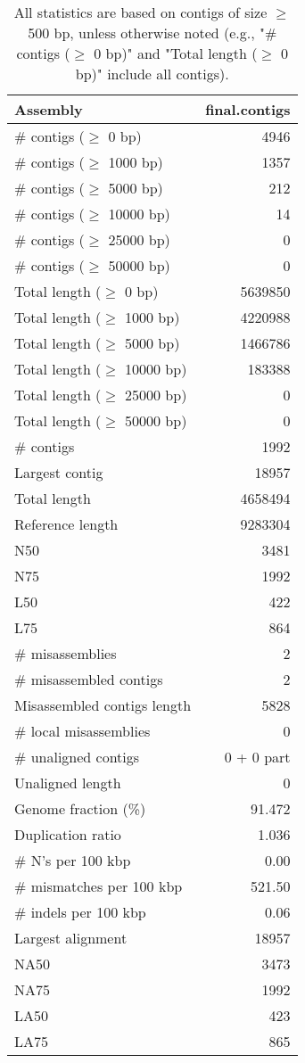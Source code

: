 \documentclass[12pt,a4paper]{article}
\begin{document}
\begin{table}[ht]
\begin{center}
\caption{All statistics are based on contigs of size $\geq$ 500 bp, unless otherwise noted (e.g., "\# contigs ($\geq$ 0 bp)" and "Total length ($\geq$ 0 bp)" include all contigs).}
\begin{tabular}{|l*{1}{|r}|}
\hline
Assembly & final.contigs \\ \hline
\# contigs ($\geq$ 0 bp) & 4946 \\ \hline
\# contigs ($\geq$ 1000 bp) & 1357 \\ \hline
\# contigs ($\geq$ 5000 bp) & 212 \\ \hline
\# contigs ($\geq$ 10000 bp) & 14 \\ \hline
\# contigs ($\geq$ 25000 bp) & 0 \\ \hline
\# contigs ($\geq$ 50000 bp) & 0 \\ \hline
Total length ($\geq$ 0 bp) & 5639850 \\ \hline
Total length ($\geq$ 1000 bp) & 4220988 \\ \hline
Total length ($\geq$ 5000 bp) & 1466786 \\ \hline
Total length ($\geq$ 10000 bp) & 183388 \\ \hline
Total length ($\geq$ 25000 bp) & 0 \\ \hline
Total length ($\geq$ 50000 bp) & 0 \\ \hline
\# contigs & 1992 \\ \hline
Largest contig & 18957 \\ \hline
Total length & 4658494 \\ \hline
Reference length & 9283304 \\ \hline
N50 & 3481 \\ \hline
N75 & 1992 \\ \hline
L50 & 422 \\ \hline
L75 & 864 \\ \hline
\# misassemblies & 2 \\ \hline
\# misassembled contigs & 2 \\ \hline
Misassembled contigs length & 5828 \\ \hline
\# local misassemblies & 0 \\ \hline
\# unaligned contigs & 0 + 0 part \\ \hline
Unaligned length & 0 \\ \hline
Genome fraction (\%) & 91.472 \\ \hline
Duplication ratio & 1.036 \\ \hline
\# N's per 100 kbp & 0.00 \\ \hline
\# mismatches per 100 kbp & 521.50 \\ \hline
\# indels per 100 kbp & 0.06 \\ \hline
Largest alignment & 18957 \\ \hline
NA50 & 3473 \\ \hline
NA75 & 1992 \\ \hline
LA50 & 423 \\ \hline
LA75 & 865 \\ \hline
\end{tabular}
\end{center}
\end{table}
\end{document}

